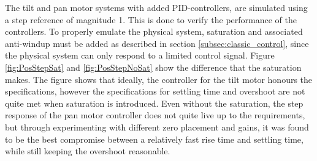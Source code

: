 \documentclass[../../main.tex]{subfiles}
\begin{document}
The tilt and pan motor systems with added PID-controllers, are simulated using a step reference of magnitude 1. This is done to verify the performance of the controllers. To properly emulate the physical system, saturation and associated anti-windup must be added as described in section \ref{subsec:classic_control}, since the physical system can only respond to a limited control signal. Figure \ref{fig:PosStepSat} and \ref{fig:PosStepNoSat} show the difference that the saturation makes. The figure shows that ideally, the controller for the tilt motor honours the specifications, however the specifications for settling time and overshoot are not quite met when saturation is introduced. Even without the saturation, the step response of the pan motor controller does not quite live up to the  requirements, but through experimenting with different zero placement and gains, it was found to be the best compromise between a relatively fast rise time and settling time, while still keeping the overshoot reasonable.
\end{document}
